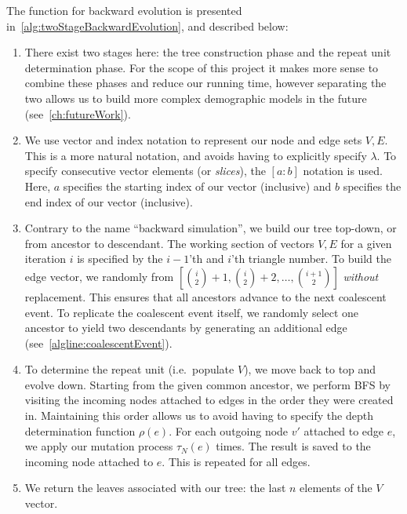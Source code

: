 The function for backward evolution is presented in~\autoref{alg:twoStageBackwardEvolution}, and described below:
\begin{enumerate}
    \item There exist two stages here: the tree construction phase and the repeat unit determination phase.
        For the scope of this project it makes more sense to combine these phases and reduce our running time, however
        separating the two allows us to build more complex demographic models in the future
        (see~\autoref{ch:futureWork}).
    \item We use vector and index notation to represent our node and edge sets $V, E$.
        This is a more natural notation, and avoids having to explicitly specify $\lambda$.
        To specify consecutive vector elements (or \emph{slices}), the $[a:b]$ notation is used.
        Here, $a$ specifies the starting index of our vector (inclusive) and $b$ specifies the end index of our
        vector (inclusive).
    \item Contrary to the name ``backward simulation'', we build our tree top-down, or from ancestor to descendant.
        The working section of vectors $V, E$ for a given iteration $i$ is specified by the $i - 1$'th and $i$'th
        triangle number.
        To build the edge vector, we randomly from $\left[\binom{i}{2} + 1, \binom{i}{2} + 2, \ldots,
        \binom{i + 1}{2}\right]$
        \emph{without} replacement.
        This ensures that all ancestors advance to the next coalescent event.
        To replicate the coalescent event itself, we randomly select one ancestor to yield two descendants by generating
        an additional edge (see~\autoref{algline:coalescentEvent}).
    \item To determine the repeat unit (i.e.\ populate $V$), we move back to top and evolve down.
        Starting from the given common ancestor, we perform BFS by visiting the incoming nodes attached to edges in
        the order they were created in.
        Maintaining this order allows us to avoid having to specify the depth determination function $\rho(e)$.
        For each outgoing node $v'$ attached to edge $e$, we apply our mutation process $\tau_N(e)$ times.
        The result is saved to the incoming node attached to $e$.
        This is repeated for all edges.
    \item We return the leaves associated with our tree: the last $n$ elements of the $V$ vector.
\end{enumerate}

